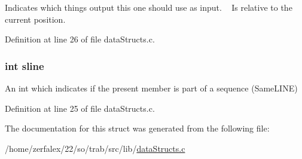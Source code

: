 Indicates which thing\textquotesingle{}s output this one should use as input.  ~\newline
 Is relative to the current position. 



Definition at line 26 of file data\+Structs.\+c.

\subsubsection[{\texorpdfstring{sline}{sline}}]{\setlength{\rightskip}{0pt plus 5cm}int sline}\hypertarget{structthing_a8260a04cd33e11250d7680ccd06af2fc}{}\label{structthing_a8260a04cd33e11250d7680ccd06af2fc}


An int which indicates if the present member is part of a sequence (Same\+L\+I\+NE) 



Definition at line 25 of file data\+Structs.\+c.



The documentation for this struct was generated from the following file\+:\begin{DoxyCompactItemize}
\item 
/home/zerfalex/22/so/trab/src/lib/\hyperlink{data_structs_8c}{data\+Structs.\+c}\end{DoxyCompactItemize}
